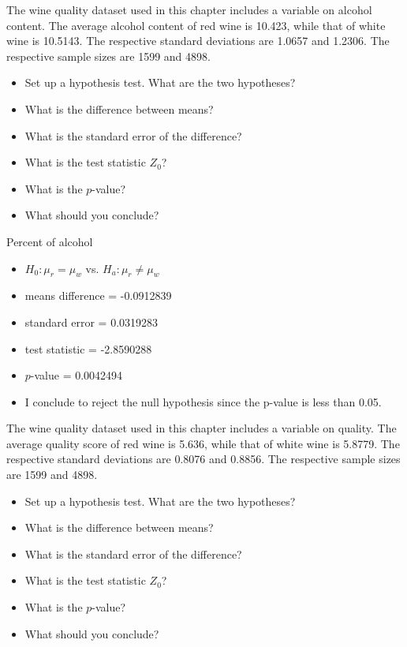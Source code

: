 \documentclass[11pt, chapterprefix=true]{scrbook}\usepackage[]{graphicx}\usepackage[]{color}
\begin{document}
\begin{exercises}
\begin{exercise} %



The wine quality dataset used in this chapter includes a variable on alcohol content. The average alcohol content of red wine is 10.423, while that of white wine is 10.5143. The respective standard deviations are 1.0657 and 1.2306. The respective sample sizes are 1599 and 4898.

\begin{itemize}
  \item Set up a hypothesis test. What are the two hypotheses?
  \item What is the difference between means?
  \item What is the standard error of the difference?
  \item What is the test statistic $Z_0$?
  \item What is the $p$-value?
  \item What should you conclude?
\end{itemize}

\end{exercise}
\begin{solution} %

Percent of alcohol 

\begin{itemize}
  \item $H_0: \mu_r = \mu_w$ vs. $H_a: \mu_r \ne \mu_w$
  \item  means difference = -0.0912839
  \item  standard error  = 0.0319283
  \item  test statistic = -2.8590288
  \item  $p$-value = 0.0042494
  \item  I conclude to reject the null hypothesis since the p-value is less than 0.05.
\end{itemize}

\end{solution}

\begin{exercise} %

The wine quality dataset used in this chapter includes a variable on quality. The average quality score of red wine is 5.636, while that of white wine is 5.8779. The respective standard deviations are 0.8076 and 0.8856. The respective sample sizes are 1599 and 4898.

\begin{itemize}
  \item Set up a hypothesis test. What are the two hypotheses?
  \item What is the difference between means?
  \item What is the standard error of the difference?
  \item What is the test statistic $Z_0$?
  \item What is the $p$-value?
  \item What should you conclude?
\end{itemize}


\end{exercise}
\end{exercises}
\end{document}
